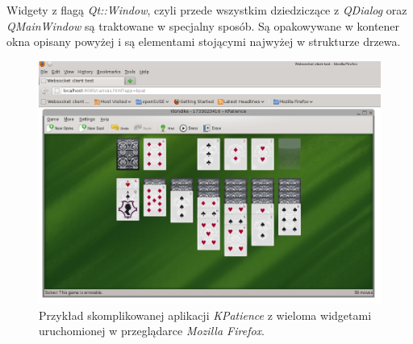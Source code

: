 Widgety z flagą \emph{Qt::Window}, czyli przede wszystkim dziedziczące z \emph{QDialog} oraz \emph{QMainWindow} są traktowane w specjalny sposób. Są opakowywane w kontener okna opisany powyżej i są elementami stojącymi najwyżej w strukturze drzewa.

\begin{figure}
\centering
\includegraphics[width=0.7\linewidth]{img/example}
\caption{Przykład skomplikowanej aplikacji \emph{KPatience} z wieloma widgetami uruchomionej w przeglądarce \emph{Mozilla Firefox}.}
\label{fig:example}
\end{figure}
